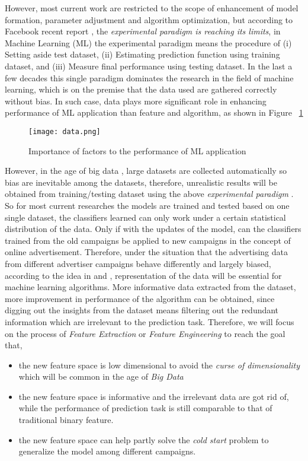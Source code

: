 However, most current work are restricted to the scope of enhancement of model formation, parameter adjustment and algorithm optimization, but according to Facebook recent report \cite{facebook2015}, the \textit{experimental paradigm is reaching its limits}, in Machine Learning (ML) the experimental paradigm means the procedure of  (i) Setting aside test dataset, (ii) Estimating prediction function using training dataset, and (iii) Measure final performance using testing dataset. In the last a few decades this single paradigm dominates the research in the field of machine learning, which is on the premise that the data used are gathered correctly without bias. In such case, data plays more significant role in enhancing performance of ML application than feature and algorithm, as shown in Figure ~\ref{fig:datai}

\begin{figure}[h]
\centering
\texttt{[image: data.png]}
\caption{Importance of factors to the performance of ML application}
\label{fig:datai}
\end{figure}

However, in the age of big data \cite{lohr2012age}, large datasets are collected automatically so bias are inevitable among the datasets, therefore, unrealistic results will be obtained from training/testing dataset using the above \textit{experimental paradigm} \cite{torralba2011unbiased}. So for most current researches the models are trained and tested based on one single dataset, the classifiers learned can only work under a certain statistical distribution of the data. Only if with the updates of the model, can the classifiers trained from the old campaigns be applied to new campaigns in the concept of online advertisement. Therefore, under the situation that the advertising data from different advertiser campaigns behave differently and largely biased, according to the idea in \cite{threethings2015} and \cite{domingos2012few}, representation of the data will be essential for machine learning algorithms. More informative data extracted from the dataset, more improvement in performance of the algorithm can be obtained, since digging out the insights from the dataset means filtering out the redundant information which are irrelevant to the prediction task. Therefore, we will focus on the process of \textit{Feature Extraction} or \textit{Feature Engineering} to reach the goal that, 
\begin{itemize}
\item  the new feature space is low dimensional to avoid the \textit{curse of dimensionality} which will be common in the age of \textit{Big Data}
\item the new feature space is informative and the irrelevant data are got rid of, while the performance of prediction task is still comparable to that of traditional binary feature.
\item  the new feature space can help partly solve the \textit{cold start} problem to generalize the model among different campaigns.
\end{itemize}

